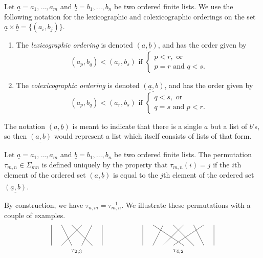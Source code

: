 \begin{nota}\label{nota:double-underlines}
Let $\underline{a} = a_{1}, \ldots , a_{m}$ and $\underline{b} = b_{1}, \ldots, b_{n}$ be two ordered finite lists. We use the following notation for the lexicographic and colexicographic orderings on the set $\underline{a} \times \underline{b} = \{ (a_{i}, b_{j})\}$. 
\begin{enumerate}
\item The \emph{lexicographic ordering} is denoted $\underline{(a, \underline{b})}$, and has the order given by
  \[
    (a_{p}, b_{q}) < (a_{r}, b_{s}) \textrm{ if } \left\{ \begin{array}{l} p < r, \textrm{ or } \\ p=r \textrm{ and } q < s. \end{array} \right.
  \]
\item The \emph{colexicographic ordering} is denoted $\underline{(\underline{a}, b)}$, and has the order given by
\[
    (a_{p}, b_{q}) < (a_{r}, b_{s}) \textrm{ if } \left\{ \begin{array}{l} q < s, \textrm{ or } \\ q=s \textrm{ and } p < r. \end{array} \right.
  \]
\end{enumerate}
\end{nota}

\begin{rem}
The notation $(a, \underline{b})$ is meant to indicate that there is a single $a$ but a list of $b$'s, so then $\underline{(a, \underline{b})}$ would represent a list which itself consists of lists of that form. 
\end{rem}

\begin{Defi}\label{Defi:tau}
Let $\underline{a} = a_{1}, \ldots , a_{m}$ and $\underline{b} = b_{1}, \ldots, b_{n}$ be two ordered finite lists. 
The permutation $\tau_{m,n} \in \Sigma_{mn}$ is defined uniquely by the property that $\tau_{m,n}(i) = j$ if the $i$th element of the ordered set $\underline{(a, \underline{b})}$ is equal to the $j$th element of the ordered set $\underline{(\underline{a}, b)}$.
\end{Defi}

By construction, we have $\tau_{n,m} = \tau_{m,n}^{-1}$. We illustrate these permutations with a couple of examples.
    \[
        \xy
            {\ar@{-} (0,0) ; (0,-10)};
            {\ar@{-} (5,0) ; (10,-10)};
            {\ar@{-} (10,0) ; (20,-10)};
            {\ar@{-} (15,0) ; (5,-10)};
            {\ar@{-} (20,0) ; (15,-10)};
            {\ar@{-} (25,0) ; (25,-10)};
            (12.5,-13)*{\tau_{2,3}};
            {\ar@{-} (45,0) ; (45,-10)};
            {\ar@{-} (50,0) ; (65,-10)};
            {\ar@{-} (55,0) ; (50,-10)};
            {\ar@{-} (60,0) ; (70,-10)};
            {\ar@{-} (65,0) ; (55,-10)};
            {\ar@{-} (70,0) ; (75,-10)};
            {\ar@{-} (75,0) ; (60,-10)};
            {\ar@{-} (80,0) ; (80,-10)};
            (62.5,-13)*{\tau_{4,2}}
        \endxy
    \]

